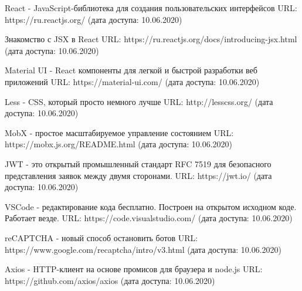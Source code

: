 \documentclass[12pt, a4paper]{diplom}
\begin{document}
\renewcommand{\bibname}{Список литературы}
\begin{thebibliography}{9}

React - JavaScript-библиотека для создания пользовательских интерфейсов
URL: https://ru.reactjs.org/
(дата доступа: 10.06.2020)

Знакомство с JSX в React
URL: https://ru.reactjs.org/docs/introducing-jsx.html
(дата доступа: 10.06.2020)

Material UI - React компоненты для легкой и быстрой разработки веб приложений
URL: https://material-ui.com/
(дата доступа: 10.06.2020)

Less - CSS, который просто немного лучше
URL: http://lesscss.org/
(дата доступа: 10.06.2020)

MobX - простое масштабируемое управление состоянием
URL: https://mobx.js.org/README.html
(дата доступа: 10.06.2020)

JWT - это открытый промышленный стандарт  RFC 7519 для безопасного представления заявок между двумя сторонами.
URL: https://jwt.io/
(дата доступа: 10.06.2020)

VSCode - редактирование кода бесплатно. Построен на открытом исходном коде. Работает везде.
URL: https://code.visualstudio.com/
(дата доступа: 10.06.2020)

reCAPTCHA - новый способ остановить ботов
URL: https://www.google.com/recaptcha/intro/v3.html
(дата доступа: 10.06.2020)

Axios - HTTP-клиент на основе промисов для браузера и node.js
URL: https://github.com/axios/axios
(дата доступа: 10.06.2020)

\end{thebibliography}
\end{document}
